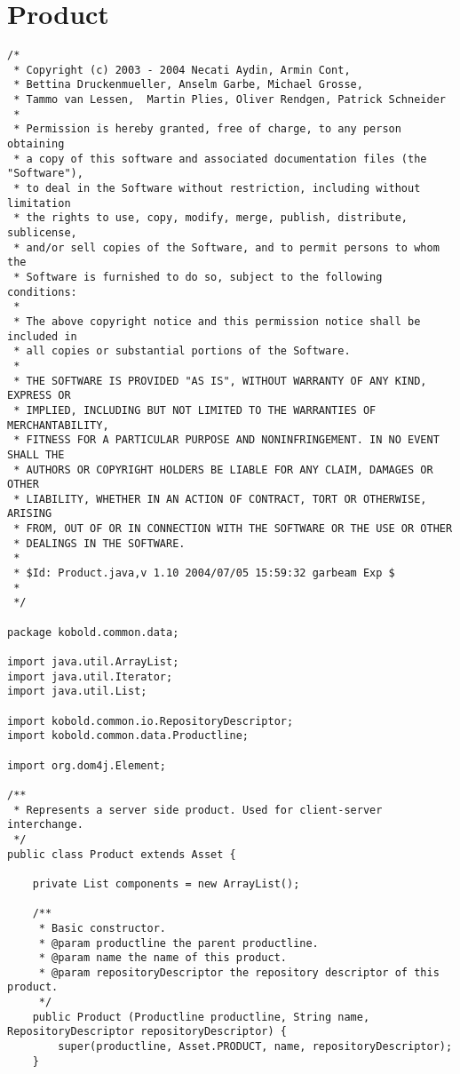 \section{Product}
\small \begin{verbatim}
/*
 * Copyright (c) 2003 - 2004 Necati Aydin, Armin Cont, 
 * Bettina Druckenmueller, Anselm Garbe, Michael Grosse, 
 * Tammo van Lessen,  Martin Plies, Oliver Rendgen, Patrick Schneider
 * 
 * Permission is hereby granted, free of charge, to any person obtaining
 * a copy of this software and associated documentation files (the "Software"),
 * to deal in the Software without restriction, including without limitation
 * the rights to use, copy, modify, merge, publish, distribute, sublicense, 
 * and/or sell copies of the Software, and to permit persons to whom the 
 * Software is furnished to do so, subject to the following conditions:
 *
 * The above copyright notice and this permission notice shall be included in 
 * all copies or substantial portions of the Software.
 *
 * THE SOFTWARE IS PROVIDED "AS IS", WITHOUT WARRANTY OF ANY KIND, EXPRESS OR 
 * IMPLIED, INCLUDING BUT NOT LIMITED TO THE WARRANTIES OF MERCHANTABILITY, 
 * FITNESS FOR A PARTICULAR PURPOSE AND NONINFRINGEMENT. IN NO EVENT SHALL THE 
 * AUTHORS OR COPYRIGHT HOLDERS BE LIABLE FOR ANY CLAIM, DAMAGES OR OTHER 
 * LIABILITY, WHETHER IN AN ACTION OF CONTRACT, TORT OR OTHERWISE, ARISING 
 * FROM, OUT OF OR IN CONNECTION WITH THE SOFTWARE OR THE USE OR OTHER 
 * DEALINGS IN THE SOFTWARE.
 *
 * $Id: Product.java,v 1.10 2004/07/05 15:59:32 garbeam Exp $
 *
 */

package kobold.common.data;

import java.util.ArrayList;
import java.util.Iterator;
import java.util.List;

import kobold.common.io.RepositoryDescriptor;
import kobold.common.data.Productline;

import org.dom4j.Element;

/**
 * Represents a server side product. Used for client-server interchange.
 */
public class Product extends Asset {

	private List components = new ArrayList();
	
	/**
	 * Basic constructor.
	 * @param productline the parent productline.
	 * @param name the name of this product.
	 * @param repositoryDescriptor the repository descriptor of this product.
	 */
	public Product (Productline productline, String name, RepositoryDescriptor repositoryDescriptor) {
		super(productline, Asset.PRODUCT, name, repositoryDescriptor);
	}
	

\end{verbatim}
